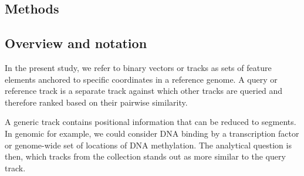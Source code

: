 \documentclass{bioinfo}
\begin{document}


\begin{methods}
\section{Methods}
\subsection{Overview and notation}
In the present study, we refer to binary vectors or tracks as sets of feature elements anchored to specific coordinates in a reference genome. A query or reference track is a separate track against which other tracks are queried and therefore ranked based on their pairwise similarity. \par A generic track contains positional information that can be reduced to segments. In genomic for example, we could consider DNA binding by a transcription factor or genome-wide set of locations of DNA methylation. The analytical question is then, which tracks from the collection stands out as more similar to the query track.  
 

\end{methods}
\end{document}
